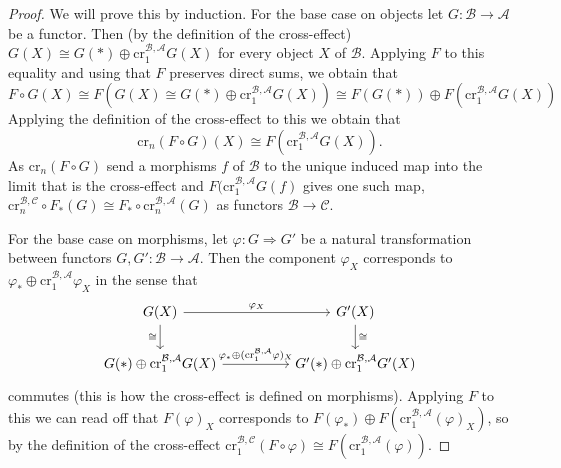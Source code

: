 \begin{proof}
    We will prove this by induction. For the base case on objects let $G: \mathcal B \to \mathcal A$ be a functor. Then (by the definition of the cross-effect)  $G(X)\cong G(*) \oplus\text{cr}_1^{\mathcal B, \mathcal A}G(X)$ for every object $X$ of $\mathcal B$. Applying $F$ to this equality and using that $F$ preserves direct sums, we obtain that 
    $$
    F\circ G (X) \cong F(G(X)\cong G(*)\oplus  \text{cr}_1^{\mathcal B, \mathcal A}G(X)) \cong F( G(*)) \oplus F(\text{cr}_1^{\mathcal B, \mathcal A}G(X))
    $$
    Applying the definition of the cross-effect to this we obtain that
    $$\text{cr}_n(F \circ G)(X) \cong F(\text{cr}_1^{\mathcal B, \mathcal A}G(X)).$$
    As $\text{cr}_n(F \circ G)$ send a morphisms $f$ of $\mathcal B$ to the unique induced map into the limit that is the cross-effect and $F(\text{cr}_1^{\mathcal B, \mathcal A}G(f)$ gives one such map, $\text{cr}_n^{\mathcal B, \mathcal C} \circ F_*(G) \cong F_* \circ \text{cr}_n^{\mathcal B, \mathcal A}(G)$ as functors $\mathcal B \to \mathcal C$.

    For the base case on morphisms, let $\varphi: G \Rightarrow G'$ be a natural transformation
    between functors $G,G': \mathcal B \to \mathcal A$. Then the component $\varphi_X$ corresponds to $\varphi_* \oplus \text{cr}_1^{\mathcal B, \mathcal A}\varphi_X$ in the sense that 
\[\begin{tikzcd}
	{G(X)} && {G'(X)} \\
	{G(*) \oplus \text{cr}_1^{\mathcal B, \mathcal A}G(X)} && {G'(*) \oplus \text{cr}_1^{\mathcal B, \mathcal A}G'(X)}
	\arrow["{\varphi_X}", from=1-1, to=1-3]
	\arrow["{\varphi_* \oplus (\text{cr}_1^{\mathcal B, \mathcal A}\varphi)_X}", from=2-1, to=2-3]
	\arrow["\cong"', from=1-1, to=2-1]
	\arrow["\cong", from=1-3, to=2-3]
\end{tikzcd}\]
    commutes (this is how the cross-effect is defined on morphisms). Applying $F$ to this we can read off that $F(\varphi)_X$ corresponds to $F(\varphi_*) \oplus F(\text{cr}_1^{\mathcal B, \mathcal A}(\varphi)_X)$, so by the definition of the cross-effect $\text{cr}_1^{\mathcal B, \mathcal C}(F \circ \varphi) \cong F(\text{cr}_1^{\mathcal B, \mathcal A}(\varphi))$.
    

\end{proof}
